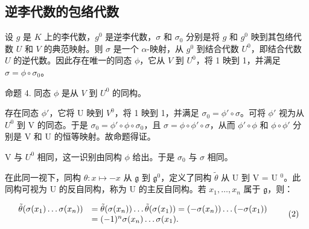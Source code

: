 \subsection{逆李代数的包络代数}

设 \(g\) 是 \(K\) 上的李代数，\(g^0\) 是逆李代数，\(\sigma\) 和 \(\sigma_0\) 分别是将 \(g\) 和 \(g^0\) 映到其包络代数 \(U\) 和 \(V\) 的典范映射。则 \(\sigma\) 是一个 \(\alpha\)-映射，从 \(g^0\) 到结合代数 \(U^0\)，即结合代数 \(U\) 的逆代数。因此存在唯一的同态 \(\phi\)，它从 \(V\) 到 \(U^0\)，将 1 映到 1，并满足 \(\sigma = \phi \circ \sigma_0\)。

命题 4. 同态 \(\phi\) 是从 \(V\) 到 \(U^0\) 的同构。

存在同态 \(\phi'\)，它将 U 映到 \(V^0\)，将 1 映到 1，并满足 \(\sigma_0 = \phi' \circ \sigma\)。可将 \(\phi'\) 视为从 \(U^0\) 到 V 的同态。于是 \(\sigma_0 = \phi' \circ \phi \circ \sigma_0\)，且 \(\sigma = \phi \circ \phi' \circ \sigma\)，从而 \(\phi' \circ \phi\) 和 \(\phi \circ \phi'\) 分别是 V 和 U 的恒等映射。故命题得证。

V 与 \(U^{0}\) 相同，这一识别由同构 \(\phi\) 给出。于是 \(\sigma_{0}\) 与 \(\sigma\) 相同。

在此同一视下，同构 \(\theta: x \mapsto -x\) 从 \(\mathfrak{g}\) 到 \(\mathfrak{g}^0\)，定义了同构 \(\tilde{\theta}\) 从 U 到 V = U \(^0\)。此同构可视为 U 的反自同构，称为 U 的主反自同构。若 \(x_{1}, \ldots, x_{n}\) 属于 \(\mathfrak{g}\)，则：

\[
\begin{array}{r l} \tilde {\theta} (\sigma (x _ {1}) \dots \sigma (x _ {n})) & = \tilde {\theta} (\sigma (x _ {n})) \dots \tilde {\theta} (\sigma (x _ {1})) = (- \sigma (x _ {n})) \dots (- \sigma (x _ {1})) \\ & = (- 1) ^ {n} \sigma (x _ {n}) \dots \sigma (x _ {1}). \end{array}\tag{2}
\]

